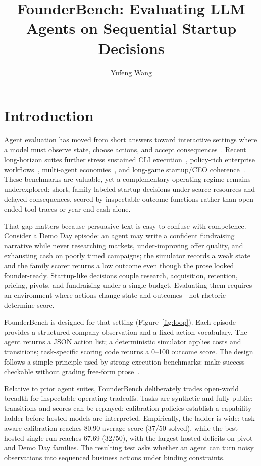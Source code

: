 \documentclass[sigconf,review]{acmart}
\title{FounderBench: Evaluating LLM Agents on Sequential Startup Decisions}
\author{Yufeng Wang}
\affiliation{%
  \institution{Independent Researcher}
  \country{United States}}
\begin{document}
\maketitle

\section{Introduction}
Agent evaluation has moved from short answers toward interactive settings where a model must observe state, choose actions, and accept consequences~\cite{liu2025agentbench,mialon2023gaia,jimenez2024swebench,zhou2024webarena,yao2024taubench,merrill2026terminalbench,li2026lhtb}.
Recent long-horizon suites further stress sustained CLI execution~\cite{merrill2026terminalbench,li2026lhtb}, policy-rich enterprise workflows~\cite{chen2026chibench}, multi-agent economies~\cite{sugiura2026coffeebench}, and long-game startup/CEO coherence~\cite{he2026ycbench,chen2026ceobench}.
These benchmarks are valuable, yet a complementary operating regime remains underexplored: short, family-labeled startup decisions under scarce resources and delayed consequences, scored by inspectable outcome functions rather than open-ended tool traces or year-end cash alone.

That gap matters because persuasive text is easy to confuse with competence.
Consider a Demo Day episode: an agent may write a confident fundraising narrative while never researching markets, under-improving offer quality, and exhausting cash on poorly timed campaigns; the simulator records a weak state and the family scorer returns a low outcome even though the prose looked founder-ready.
Startup-like decisions couple research, acquisition, retention, pricing, pivots, and fundraising under a single budget.
Evaluating them requires an environment where actions change state and outcomes---not rhetoric---determine score.

FounderBench is designed for that setting (Figure~\ref{fig:loop}).
Each episode provides a structured company observation and a fixed action vocabulary.
The agent returns a JSON action list; a deterministic simulator applies costs and transitions; task-specific scoring code returns a 0--100 outcome score.
The design follows a simple principle used by strong execution benchmarks: make success checkable without grading free-form prose~\cite{jimenez2024swebench,zhou2024webarena,mialon2023gaia}.

Relative to prior agent suites, FounderBench deliberately trades open-world breadth for inspectable operating tradeoffs.
Tasks are synthetic and fully public; transitions and scores can be replayed; calibration policies establish a capability ladder before hosted models are interpreted.
Empirically, the ladder is wide: task-aware calibration reaches 80.90 average score (37/50 solved), while the best hosted single run reaches 67.69 (32/50), with the largest hosted deficits on pivot and Demo Day families.
The resulting test asks whether an agent can turn noisy observations into sequenced business actions under binding constraints.
\end{document}
